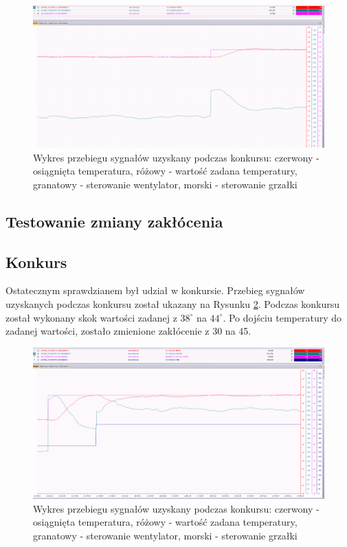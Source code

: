 \documentclass[12pt, a4paper]{article}
\begin{document}
\begin{figure}[H]
	\centering
	\includegraphics[width=0.9\linewidth]{wiatrak20temp3841}
	\caption{Wykres przebiegu sygnałów uzyskany podczas konkursu: czerwony - osiągnięta temperatura, różowy - wartość zadana temperatury, granatowy - sterowanie wentylator, morski - sterowanie  grzałki}
	\label{fig:wiatrak20temp3841}
\end{figure}

\subsection{Testowanie zmiany zakłócenia}


\subsection{Konkurs}
Ostatecznym sprawdzianem był udział w konkursie. Przebieg sygnałów uzyskanych podczas konkursu został ukazany na Rysunku \ref{fig:konkurs}. Podczas konkursu został wykonany skok wartości zadanej z $38^\circ$ na $44^\circ$. Po dojściu temperatury do zadanej wartości, zostało zmienione zakłócenie z 30 na 45. 

\begin{figure}[H]
	\centering
	\includegraphics[width=0.9\linewidth]{konkurs}
	\caption{Wykres przebiegu sygnałów uzyskany podczas konkursu: czerwony - osiągnięta temperatura, różowy - wartość zadana temperatury, granatowy - sterowanie wentylator, morski - sterowanie  grzałki}
	\label{fig:konkurs}
\end{figure}
\end{document}

